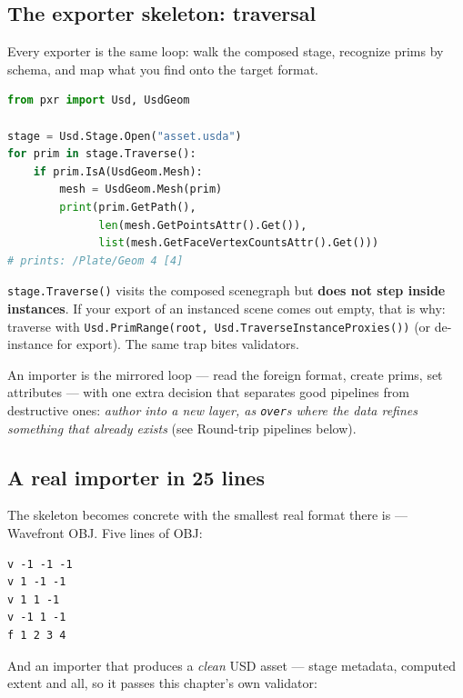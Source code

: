 \subsection{The exporter skeleton: traversal}\label{sec:de-trav}
Every exporter is the same loop: walk the composed stage,
recognize prims by schema, and map what you find onto the target format.

\begin{lstlisting}[language=Python]
from pxr import Usd, UsdGeom

stage = Usd.Stage.Open("asset.usda")
for prim in stage.Traverse():
    if prim.IsA(UsdGeom.Mesh):
        mesh = UsdGeom.Mesh(prim)
        print(prim.GetPath(),
              len(mesh.GetPointsAttr().Get()),
              list(mesh.GetFaceVertexCountsAttr().Get()))
# prints: /Plate/Geom 4 [4]
\end{lstlisting}

\begin{Gotcha}
\texttt{stage.Traverse()} visits the composed scenegraph but \textbf{does not
step inside instances}. If your export of an instanced scene comes out empty,
that is why: traverse with
\texttt{Usd.PrimRange(root, Usd.TraverseInstanceProxies())} (or de-instance
for export). The same trap bites validators.
\end{Gotcha}

An importer is the mirrored loop --- read the foreign format, create prims,
set attributes --- with one extra decision that separates good pipelines from
destructive ones: \emph{author into a new layer, as \texttt{over}s where the
data refines something that already exists} (see Round-trip pipelines below).

\subsection{A real importer in 25 lines}\label{sec:de-importer}
The skeleton becomes concrete with the smallest real format there is ---
Wavefront OBJ. Five lines of OBJ:

\begin{lstlisting}
v -1 -1 -1
v 1 -1 -1
v 1 1 -1
v -1 1 -1
f 1 2 3 4
\end{lstlisting}

\noindent And an importer that produces a \emph{clean} USD asset --- stage
metadata, computed extent and all, so it passes this chapter's own validator:

